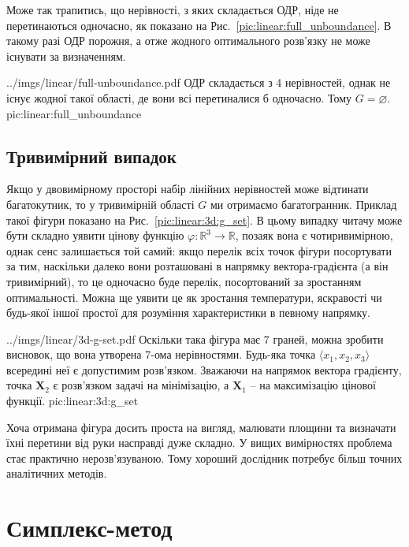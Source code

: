 \documentclass[\main/book.tex]{subfiles}
\begin{document}
Може так трапитись, що нерівності, з яких складається ОДР, ніде не перетинаються одночасно, як показано на Рис.~\ref{pic:linear:full_unboundance}. В такому разі ОДР порожня, а отже жодного оптимального розв'язку не може існувати за визначенням.

\illustration
 {../imgs/linear/full-unboundance.pdf}
 {ОДР складається з 4 нерівностей, однак не існує жодної такої області, де вони всі перетиналися б одночасно. Тому $G = \varnothing$.}
 {pic:linear:full_unboundance}

\subsection{Тривимірний випадок}

Якщо у двовимірному просторі набір лінійних нерівностей може відтинати багатокутник, то у тривимірній області $G$ ми отримаємо багатогранник. Приклад такої фігури показано на Рис.~\ref{pic:linear:3d:g_set}. В цьому випадку читачу може бути складно уявити цінову функцію ${\varphi: \mathbb{R}^3 \rightarrow \mathbb{R}}$, позаяк вона є чотиривимірною, однак сенс залишається той самий: якщо перелік всіх точок фігури посортувати за тим, наскільки \flqq{}далеко\frqq{} вони розташовані в напрямку вектора-градієнта (а він тривимірний), то це одночасно буде перелік, посортований за зростанням оптимальності. Можна ще уявити це як зростання температури, яскравості чи будь-якої іншої простої для розуміння характеристики в певному напрямку.

\illustration
 {../imgs/linear/3d-g-set.pdf}
 {Оскільки така фігура має 7 граней, можна зробити висновок, що вона утворена 7-ома нерівностями. Будь-яка точка $\langle x_1, x_2, x_3 \rangle$ всередині неї є допустимим розв'язком. Зважаючи на напрямок вектора градієнту, точка $\mathbf{X}_2$ є розв'язком задачі на мінімізацію, а $\mathbf{X}_1$ -- на максимізацію цінової функції.}
 {pic:linear:3d:g_set}
 
\begin{note}
 Хоча отримана фігура досить проста на вигляд, малювати площини та визначати їхні перетини від руки насправді дуже складно. У вищих вимірностях проблема стає практично нерозв'язуваною. Тому хороший дослідник потребує більш точних аналітичних методів.
\end{note}

\section{Симплекс-метод}
\label{section:linear:simplex}
\end{document}
